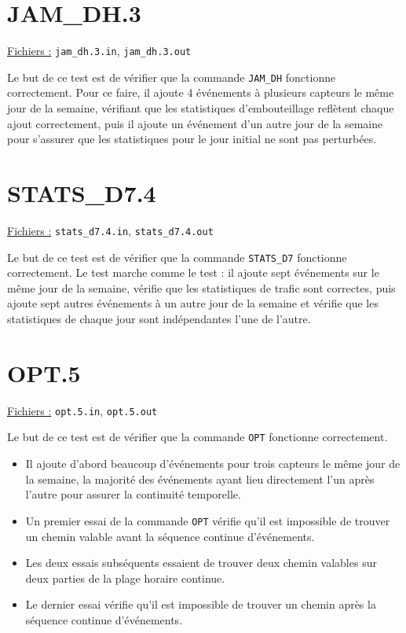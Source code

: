 \documentclass[11pt,a4paper]{article}
\begin{document}
\section*{JAM\_DH.3}
\label{sec:JAM_DH.3}

\underline{Fichiers :} \texttt{jam\_dh.3.in}, \texttt{jam\_dh.3.out}

Le but de ce test est de vérifier que la commande \texttt{JAM\_DH} fonctionne correctement. Pour ce faire, il ajoute 4 événements à plusieurs capteurs le même jour de la semaine, vérifiant que les statistiques d'embouteillage reflètent chaque ajout correctement, puis il ajoute un événement d'un autre jour de la semaine pour s'assurer que les statistiques pour le jour initial ne sont pas perturbées.

\section*{STATS\_D7.4}
\label{sec:STATS_D7.4}

\underline{Fichiers :} \texttt{stats\_d7.4.in}, \texttt{stats\_d7.4.out}

Le but de ce test est de vérifier que la commande \texttt{STATS\_D7} fonctionne correctement. Le test marche comme le test  : il ajoute sept événements sur le même jour de la semaine, vérifie que les statistiques de trafic sont correctes, puis ajoute sept autres événements à un autre jour de la semaine et vérifie que les statistiques de chaque jour sont indépendantes l'une de l'autre.

\section*{OPT.5}
\label{sec:OPT.5}

\underline{Fichiers :} \texttt{opt.5.in}, \texttt{opt.5.out}

Le but de ce test est de vérifier que la commande \texttt{OPT} fonctionne correctement.

\begin{itemize}
  \item Il ajoute d'abord beaucoup d'événements pour trois capteurs le même jour de la semaine, la majorité des événements ayant lieu directement l'un après l'autre pour assurer la continuité temporelle.
  \item Un premier essai de la commande \texttt{OPT} vérifie qu'il est impossible de trouver un chemin valable avant la séquence continue d'événements.
  \item Les deux essais subséquents essaient de trouver deux chemin valables sur deux parties de la plage horaire continue.
  \item Le dernier essai vérifie qu'il est impossible de trouver un chemin après la séquence continue d'événements.
\end{itemize}
\end{document}
